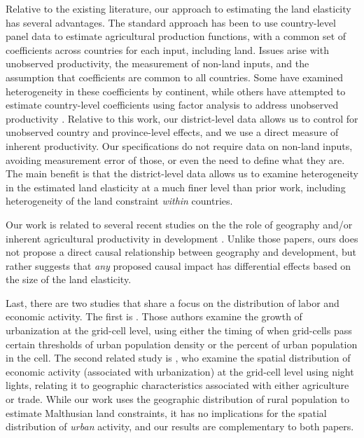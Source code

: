 \documentclass[11pt]{article}
\begin{document}
Relative to the existing literature, our approach to estimating the land elasticity has several advantages. The standard approach has been to use country-level panel data \citep{Hayami:1970ly,Hayami:1985cr,cpr1997,mm2001,Mundlak:2000dq,mbl2012,et2013mango} to estimate agricultural production functions, with a common set of coefficients across countries for each input, including land. Issues arise with unobserved productivity, the measurement of non-land inputs, and the assumption that coefficients are common to all countries. Some have examined heterogeneity in these coefficients \citep{gg2003,Wiebe2003Resource-Qualit} by continent, while others have attempted to estimate country-level coefficients using factor analysis to address unobserved productivity \citep{et2013mango,ev2016clim}. Relative to this work, our district-level data allows us to control for unobserved country and province-level effects, and we use a direct measure of inherent productivity. Our specifications do not require data on non-land inputs, avoiding measurement error of those, or even the need to define what they are. The main benefit is that the district-level data allows us to examine heterogeneity in the estimated land elasticity at a much finer level than prior work, including heterogeneity of the land constraint \textit{within} countries. 

Our work is related to several recent studies on the the role of geography and/or inherent agricultural productivity in development \citep{oh2005,ashraf2010dynamics,Nunn2011,Nunn2012,mich2012,agn2013,cook14,cook2014role,fenske2014,alsan2015,ashrafmich2015,dks2015,galorozak2016,litina2016,ads2016,FrankemaPap2017}. Unlike those papers, ours does not propose a direct causal relationship between geography and development, but rather suggests that \textit{any} proposed causal impact has differential effects based on the size of the land elasticity. 

Last, there are two studies that share a focus on the distribution of labor and economic activity. The first is \citet{mfm2014}. Those authors examine the growth of urbanization at the grid-cell level, using either the timing of when grid-cells pass certain thresholds of urban population density or the percent of urban population in the cell. The second related study is \citet{hssw2016}, who examine the spatial distribution of economic activity (associated with urbanization) at the grid-cell level using night lights, relating it to geographic characteristics associated with either agriculture or trade. While our work uses the geographic distribution of rural population to estimate Malthusian land constraints, it has no implications for the spatial distribution of \textit{urban} activity, and our results are complementary to both papers.
\end{document}
